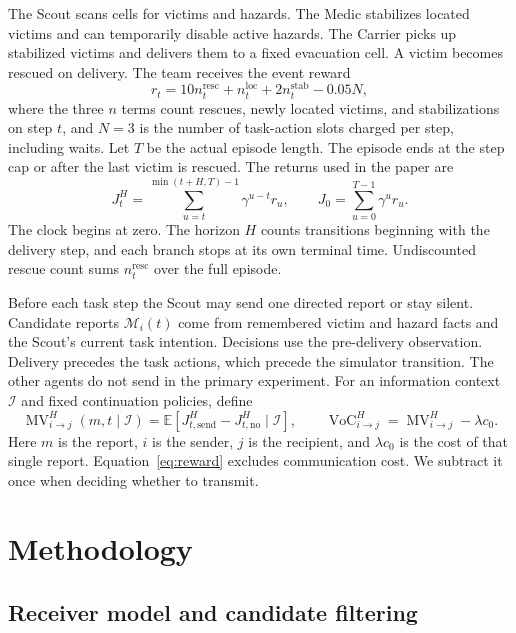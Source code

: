 \documentclass{article}
\newcommand{\MV}{\operatorname{MV}}
\newcommand{\VoC}{\operatorname{VoC}}
\newcommand{\E}{\mathbb{E}}
\begin{document}
The Scout scans cells for victims and hazards. The Medic stabilizes located victims and can temporarily disable active hazards. The Carrier picks up stabilized victims and delivers them to a fixed evacuation cell. A victim becomes rescued on delivery. The team receives the event reward
\begin{equation}
 r_t=10n_t^{\mathrm{resc}}+n_t^{\mathrm{loc}}+2n_t^{\mathrm{stab}}-0.05N ,
 \label{eq:reward}
\end{equation}
where the three $n$ terms count rescues, newly located victims, and stabilizations on step $t$, and $N=3$ is the number of task-action slots charged per step, including waits. Let $T$ be the actual episode length. The episode ends at the step cap or after the last victim is rescued. The returns used in the paper are
\begin{equation}
 J_t^H=\sum_{u=t}^{\min(t+H,T)-1}\gamma^{u-t}r_u,\qquad
 J_0=\sum_{u=0}^{T-1}\gamma^u r_u .
 \label{eq:return}
\end{equation}
The clock begins at zero. The horizon $H$ counts transitions beginning with the delivery step, and each branch stops at its own terminal time. Undiscounted rescue count sums $n_t^{\mathrm{resc}}$ over the full episode.

Before each task step the Scout may send one directed report or stay silent. Candidate reports $\mathcal M_i(t)$ come from remembered victim and hazard facts and the Scout's current task intention. Decisions use the pre-delivery observation. Delivery precedes the task actions, which precede the simulator transition. The other agents do not send in the primary experiment. For an information context $\mathcal I$ and fixed continuation policies, define
\begin{equation}
 \MV^H_{i\to j}(m,t\mid\mathcal I)
 =\E[J_{t,\mathrm{send}}^H-J_{t,\mathrm{no}}^H\mid\mathcal I],
 \qquad
 \VoC^H_{i\to j}=\MV^H_{i\to j}-\lambda c_0 .
 \label{eq:voc}
\end{equation}
Here $m$ is the report, $i$ is the sender, $j$ is the recipient, and $\lambda c_0$ is the cost of that single report. Equation~\eqref{eq:reward} excludes communication cost. We subtract it once when deciding whether to transmit.

\section{Methodology}

\subsection{Receiver model and candidate filtering}
\end{document}
